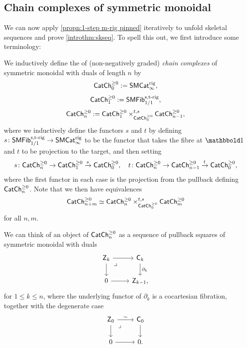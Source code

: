 \documentclass[a4paper,11pt]{article}
\begin{document}
\subsection{Chain complexes of symmetric monoidal
  \icats{}}\label{sec:chain complex unfolding}

We can now apply \cref{propn:1-step m-rig pinned} iteratively to
unfold skeletal sequences and prove
\cref{introthm:skseq}. To spell this out, we first introduce some terminology:

\begin{defn}\label{defn:chain complex cat}
  We inductively define the \icat{} of (non-negatively graded)
  \emph{chain complexes} of symmetric monoidal \icats{} with duals of
  length $n$ by
  \[ \textup{\textsf{CatCh}}^{\geq 0}_{0} := \textup{\textsf{SMCat}}_{\infty}^{\text{\textup{rig}}},\]
  \[ \textup{\textsf{CatCh}}^{\geq 0}_{1} := \textup{\textsf{SMFib}}_{1/1}^{\text{\textup{s,t-rig}}},\]
  \[ \textup{\textsf{CatCh}}^{\geq 0}_{n} := \textup{\textsf{CatCh}}^{\geq 0}_{1} \times^{t,s}_{\textup{\textsf{CatCh}}^{\geq 0}_{0}} \textup{\textsf{CatCh}}^{\geq 0}_{n-1},\]  
  where we inductively define the functors $s$ and $t$ by defining $s \colon \SMFib_{1/1}^{\strig}
  \to \SMCatI^{\rig}$ to be the functor that takes the fibre at
  $\bbone$ and $t$ to be projection to the target, and then setting
  \[ s \colon \CChp_{n} \to \CChp_{1} \xto{s} \CChp_{0},  \quad t \colon
    \CChp_{n} \to \CChp_{n-1} \xto{t} \CChp_{0},\]
  where the first functor in each case is the projection from the
  pullback defining $\textup{\textsf{CatCh}}^{\geq 0}_{n}$.
  Note that we then have equivalences
  \[ \textup{\textsf{CatCh}}^{\geq 0}_{n+m} \simeq \textup{\textsf{CatCh}}^{\geq 0}_{n} \times^{t,s}_{\textup{\textsf{CatCh}}^{\geq 0}_{0}} \textup{\textsf{CatCh}}^{\geq 0}_{m}\]
  for all $n,m$.
\end{defn}

\begin{observation}
  We can think of an object of $\textup{\textsf{CatCh}}^{\geq 0}_{n}$ as a sequence of pullback
  squares of symmetric monoidal \icats{} with duals
  \begin{equation}
    \label{eq:ch cx pb}
    \begin{tikzcd}
      \oZ_{k} \drpullback \ar[r] \ar[d] & \oC_{k} \ar[d, "\partial_{k}"] \\
      0  \ar[r] & \oZ_{k-1},
    \end{tikzcd}
  \end{equation}
  for $1 \leq k \leq n$, where the underlying functor of
  $\partial_{k}$ is a cocartesian fibration, together with the
  degenerate case
  \[
    \begin{tikzcd}
      \oZ_{0} \drpullback \ar[r, "\sim"] \ar[d] & \oC_{0} \ar[d] \\
      0  \ar[r] & 0.
    \end{tikzcd}
  \]
\end{observation}
\end{document}
